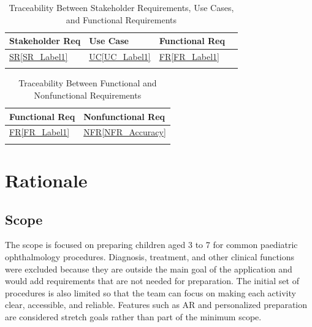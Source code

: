 \documentclass[12pt]{article}
\newcommand{\srref}[1]{\hyperref[#1]{SR\ref*{#1}}}
\newcommand{\ucref}[1]{\hyperref[#1]{UC\ref*{#1}}}
\newcommand{\rref}[1]{\hyperref[#1]{FR\ref*{#1}}}
\newcommand{\nfrref}[1]{\hyperref[#1]{NFR\ref*{#1}}}
\begin{document}



\begin{longtable}{p{} p{} p{} p{}}

\toprule
Stakeholder Req & Use Case & Functional Req \\
\midrule
\srref{SR_Label1} & \ucref{UC_Label1} & \rref{FR_Label1} \\
\bottomrule

\caption{Traceability Between Stakeholder Requirements, Use Cases, and
Functional Requirements} \label{tab:SR2UC2FRtm}
\end{longtable}

\begin{longtable}{p{} p{}}

\toprule
Functional Req & Nonfunctional Req \\
\midrule
\rref{FR_Label1} & \nfrref{NFR_Accuracy} \\
\bottomrule
\caption{Traceability Between Functional and Nonfunctional Requirements}
\label{tab:FR2Rtm}

\end{longtable}


\section{Rationale}
\label{rationale}

\subsection{Scope}

The scope is focused on preparing children aged 3 to 7 for common paediatric
ophthalmology procedures. Diagnosis, treatment, and other clinical functions
were excluded because they are outside the main goal of the application and
would add requirements that are not needed for preparation. The initial set
of procedures is also limited so that the team can focus on making each
activity clear, accessible, and reliable. Features such as AR and personalized
preparation are considered stretch goals rather than part of the minimum
scope.
\end{document}
